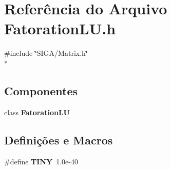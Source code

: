 \section{Referência do Arquivo Fatoration\+L\+U.\+h}
\label{_fatoration_l_u_8h}
{\ttfamily \#include \char`\"{}S\+I\+G\+A/\+Matrix.\+h\char`\"{}}\\*
\subsection*{Componentes}
\begin{DoxyCompactItemize}
\item 
class {\bf Fatoration\+LU}
\end{DoxyCompactItemize}
\subsection*{Definições e Macros}
\begin{DoxyCompactItemize}
\item 
\#define {\bf T\+I\+NY}~1.\+0e-\/40
\end{DoxyCompactItemize}
